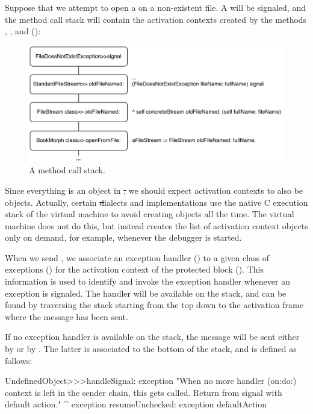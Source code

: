 \documentclass[a4paper,10pt,twoside]{book}
\begin{document}
Suppose that we attempt to open a  on a non-existent file.
A  will be signaled, and the method call stack will contain the activation contexts created by the methods , , and  ():

\begin{figure}[ht]\centering
        \includegraphics[width=.9\linewidth]{Stack}
        \caption{A \pharo method call stack.}
\end{figure}

Since everything is an object in \st, we should expect activation contexts to also be objects.
Actually, certain \st dialects and implementations use the native C execution stack of the virtual machine to avoid creating objects all the time.
The \pharo virtual machine does not do this, but instead creates the list of activation context objects only on demand, for example, whenever the debugger is started.

When we send , we associate an exception handler () to a given class of exceptions () for the activation context of the protected block ().
This information is used to identify and invoke the exception handler whenever an exception is signaled. The handler will be available on the stack, and can be found by traversing the stack starting from the top down to the activation frame where the  message has been sent.

If no exception handler is available on the stack, the message  will be sent either by  or by . The latter is associated to the bottom of the stack, and is defined as follows:

\begin{code}
UndefinedObject>>>handleSignal: exception
	"When no more handler (on:do:) context is left in the sender chain, this gets called.  Return from signal with default action."
	^ exception resumeUnchecked: exception defaultAction
\end{code}
\end{document}
